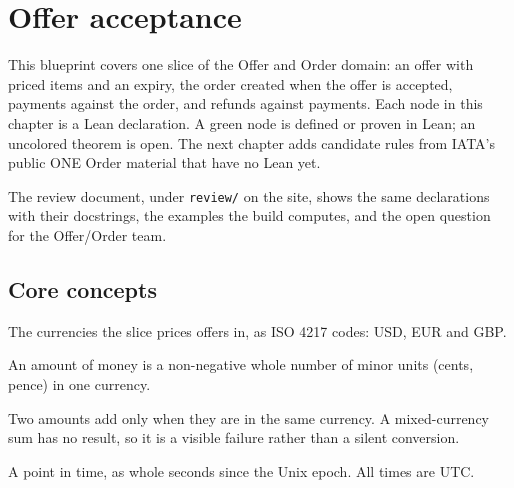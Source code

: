 %

\chapter{Offer acceptance}

This blueprint covers one slice of the Offer and Order domain: an offer with
priced items and an expiry, the order created when the offer is accepted,
payments against the order, and refunds against payments.  Each node in this
chapter is a Lean declaration.  A green node is defined or proven in Lean; an
uncolored theorem is open.  The next chapter adds candidate rules from IATA's
public ONE Order material that have no Lean yet.

The review document, under \texttt{review/} on the site, shows the same declarations with
their docstrings, the examples the build computes, and the open question for
the Offer/Order team.

\section{Core concepts}

\begin{definition}[Currency]
  \label{def:currency}
  The currencies the slice prices offers in, as ISO 4217 codes: USD, EUR and
  GBP.
\end{definition}

\begin{definition}[Money]
  \label{def:money}
  An amount of money is a non-negative whole number of minor units (cents,
  pence) in one currency.
\end{definition}

\begin{definition}
  \label{def:money-add}
  Two amounts add only when they are in the same currency.  A mixed-currency
  sum has no result, so it is a visible failure rather than a silent
  conversion.
\end{definition}

\begin{definition}[Instant]
  \label{def:instant}
  A point in time, as whole seconds since the Unix epoch.  All times are UTC.
\end{definition}

